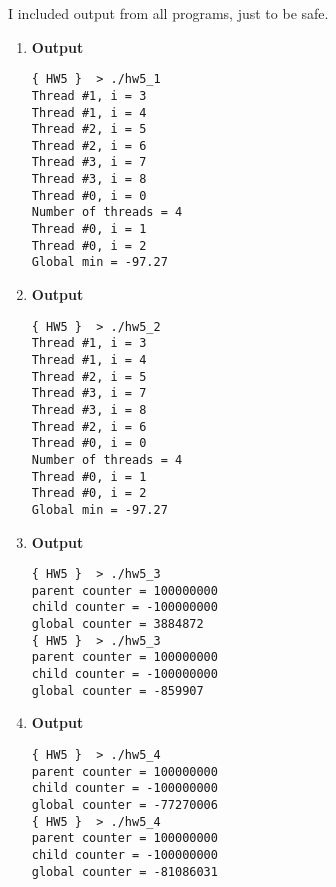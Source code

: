 \documentclass[letterpaper]{article}
\begin{document}
I included output from all programs, just to be safe.
\begin{enumerate}
    \item \textbf{Output}
    \begin{verbatim}
{ HW5 }  > ./hw5_1
Thread #1, i = 3
Thread #1, i = 4
Thread #2, i = 5
Thread #2, i = 6
Thread #3, i = 7
Thread #3, i = 8
Thread #0, i = 0
Number of threads = 4
Thread #0, i = 1
Thread #0, i = 2
Global min = -97.27
    \end{verbatim}
    \item \textbf{Output}
    \begin{verbatim}
{ HW5 }  > ./hw5_2
Thread #1, i = 3
Thread #1, i = 4
Thread #2, i = 5
Thread #3, i = 7
Thread #3, i = 8
Thread #2, i = 6
Thread #0, i = 0
Number of threads = 4
Thread #0, i = 1
Thread #0, i = 2
Global min = -97.27
    \end{verbatim}
    \item \textbf{Output}
    \begin{verbatim}
{ HW5 }  > ./hw5_3
parent counter = 100000000
child counter = -100000000
global counter = 3884872
{ HW5 }  > ./hw5_3
parent counter = 100000000
child counter = -100000000
global counter = -859907
    \end{verbatim}
    \item \textbf{Output}
    \begin{verbatim}
{ HW5 }  > ./hw5_4
parent counter = 100000000
child counter = -100000000
global counter = -77270006
{ HW5 }  > ./hw5_4
parent counter = 100000000
child counter = -100000000
global counter = -81086031
    \end{verbatim}
\end{enumerate}
\end{document}
